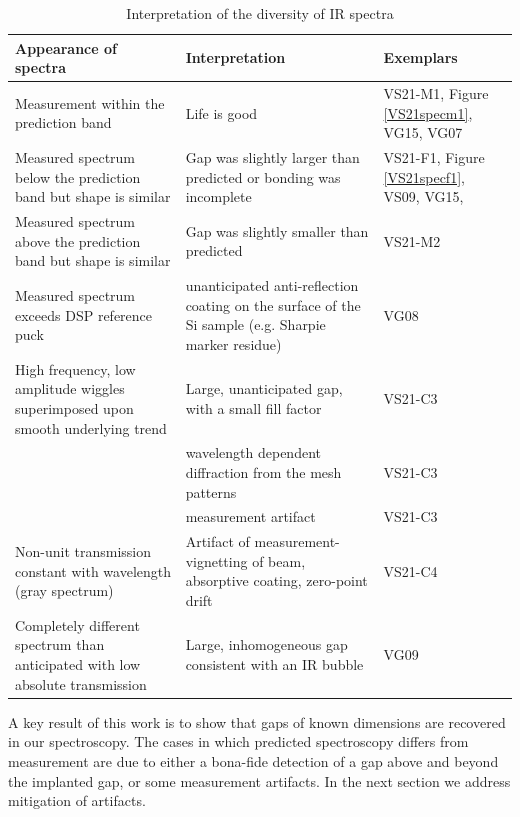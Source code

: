 \documentclass[osajnl,preprint,showpacs,superscriptaddress,12pt]{revtex4-1} %
\begin{document}
\begin{table}[h!]
  \caption{Interpretation of the diversity of IR spectra \label{tabInterpretation}}
  \begin{center}
    \begin{tabular}{ |p{8cm}| p{8cm} | p{2.2cm} |}
    \hline
    Appearance of spectra & Interpretation & Exemplars \\
    \hline
    Measurement within the prediction band & Life is good & VS21-M1, Figure \ref{VS21specm1}, VG15, VG07\\
    \hline
    Measured spectrum below the prediction band but shape is similar & Gap was slightly larger than predicted or bonding was incomplete& VS21-F1, Figure \ref{VS21specf1}, VS09, VG15, \\
    \hline
    Measured spectrum above the prediction band but shape is similar & Gap was slightly smaller than predicted & VS21-M2\\
    \hline
    Measured spectrum exceeds DSP reference puck & unanticipated anti-reflection coating on the surface of the Si sample (e.g. Sharpie marker residue) & VG08\\
    \hline
    High frequency, low amplitude wiggles superimposed upon smooth underlying trend & Large, unanticipated gap, with a small fill factor  & VS21-C3\\   
     																			     & wavelength dependent diffraction from the mesh patterns & VS21-C3\\       
     																			     & measurement artifact  & VS21-C3\\       												
    \hline
    Non-unit transmission constant with wavelength (gray spectrum) & Artifact of measurement- vignetting of beam, absorptive coating, zero-point drift & VS21-C4 \\
    \hline
    Completely different spectrum than anticipated with low absolute transmission & Large, inhomogeneous gap consistent with an IR bubble & VG09 \\
    \hline
    \end{tabular}
  \end{center}
\end{table}

A key result of this work is to show that gaps of known dimensions are recovered in our spectroscopy.  The cases in which predicted spectroscopy differs from measurement are due to either a bona-fide detection of a gap above and beyond the implanted gap, or some measurement artifacts.  In the next section we address mitigation of artifacts.
\end{document}
